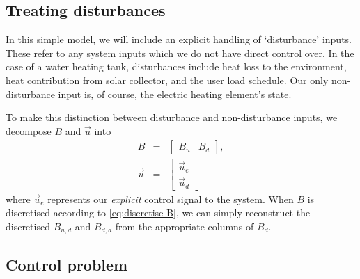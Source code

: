 \subsection{Treating disturbances}

In this simple model, we will include an explicit handling of `disturbance' inputs.
These refer to any system inputs which we do not have direct control over.
In the case of a water heating tank, disturbances include heat loss to the environment, heat contribution from solar collector, and the user load schedule.
Our only non-disturbance input is, of course, the electric heating element's state.

To make this distinction between disturbance and non-disturbance inputs, we decompose $B$ and $\vec{u}$ into
\begin{eqnarray}
	B &=& \left[\begin{array}{cc}
		B_u & B_d
	\end{array}\right], \\
	\vec{u} &=& \left[\begin{array}{c}
		\vec{u}_e \\ \vec{u}_d
	\end{array}\right]
\end{eqnarray}
where $\vec{u}_e$ represents our \emph{explicit} control signal to the system.
When $B$ is discretised according to \autoref{eq:discretise-B}, we can simply reconstruct the discretised $B_{u, d}$ and $B_{d, d}$ from the appropriate columns of $B_d$.

\subsection{Control problem}


